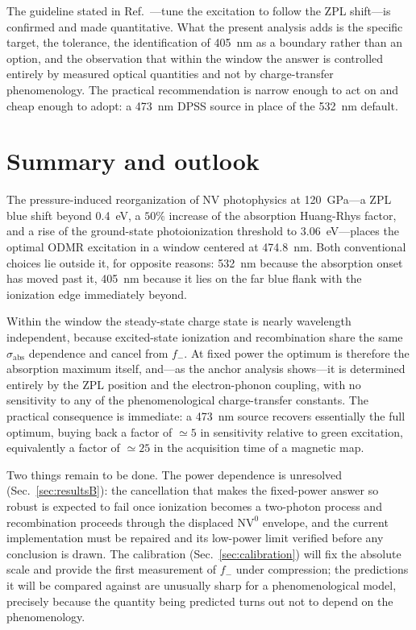 \documentclass[preprint,12pt]{elsarticle}
\newcommand{\NVz}{\ensuremath{\mathrm{NV}^{0}}}
\newcommand{\sabs}{\ensuremath{\sigma_{\mathrm{abs}}}}
\newcommand{\fm}{\ensuremath{f_{-}}}
\begin{document}
The guideline stated in Ref.~\cite{Ho2026}---tune the excitation to follow the
ZPL shift---is confirmed and made quantitative. What the present analysis adds is
the specific target, the tolerance, the identification of \SI{405}{\nano\meter}
as a boundary rather than an option, and the observation that within the window
the answer is controlled entirely by measured optical quantities and not by
charge-transfer phenomenology. The practical recommendation is narrow enough to
act on and cheap enough to adopt: a \SI{473}{\nano\meter} DPSS source in place of
the \SI{532}{\nano\meter} default.

\section{Summary and outlook}
\label{sec:conclusion}

The pressure-induced reorganization of NV photophysics at
\SI{120}{\giga\pascal}---a ZPL blue shift beyond \SI{0.4}{\electronvolt}, a
$50\%$ increase of the absorption Huang-Rhys factor, and a rise of the
ground-state photoionization threshold to \SI{3.06}{\electronvolt}---places the
optimal ODMR excitation in a window centered at \SI{474.8}{\nano\meter}. Both
conventional choices lie outside it, for opposite reasons:
\SI{532}{\nano\meter} because the absorption onset has moved past it,
\SI{405}{\nano\meter} because it lies on the far blue flank with the ionization
edge immediately beyond.

Within the window the steady-state charge state is nearly wavelength
independent, because excited-state ionization and recombination share the same
$\sabs$ dependence and cancel from $\fm$. At fixed power the optimum is therefore
the absorption maximum itself, and---as the anchor analysis shows---it is
determined entirely by the ZPL position and the electron-phonon coupling, with no
sensitivity to any of the phenomenological charge-transfer constants. The
practical consequence is immediate: a \SI{473}{\nano\meter} source recovers
essentially the full optimum, buying back a factor of $\simeq 5$ in sensitivity
relative to green excitation, equivalently a factor of $\simeq 25$ in the
acquisition time of a magnetic map.

Two things remain to be done. The power dependence is unresolved
(Sec.~\ref{sec:resultsB}): the cancellation that makes the fixed-power answer so
robust is expected to fail once ionization becomes a two-photon process and
recombination proceeds through the displaced \NVz{} envelope, and the current
implementation must be repaired and its low-power limit verified before any
conclusion is drawn. The calibration (Sec.~\ref{sec:calibration}) will fix the
absolute scale and provide the first measurement of $\fm$ under compression; the
predictions it will be compared against are unusually sharp for a
phenomenological model, precisely because the quantity being predicted turns out
not to depend on the phenomenology.
\end{document}

